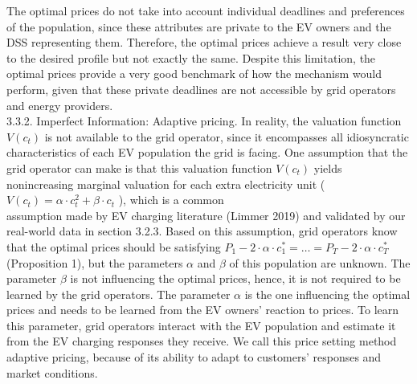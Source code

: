 \documentclass[10pt]{article}
\begin{document}
The optimal prices do not take into account individual deadlines and preferences of the population, since these attributes are private to the EV owners and the DSS representing them. Therefore, the optimal prices achieve a result very close to the desired profile but not exactly the same. Despite this limitation, the optimal prices provide a very good benchmark of how the mechanism would perform, given that these private deadlines are not accessible by grid operators and energy providers.\\
3.3.2. Imperfect Information: Adaptive pricing. In reality, the valuation function $V\left(c_{t}\right)$ is not available to the grid operator, since it encompasses all idiosyncratic characteristics of each EV population the grid is facing. One assumption that the grid operator can make is that this valuation function $V\left(c_{t}\right)$ yields nonincreasing marginal valuation for each extra electricity unit ( $V\left(c_{t}\right)=\alpha \cdot c_{t}^{2}+\beta \cdot c_{t}$ ), which is a common\\
assumption made by EV charging literature (Limmer 2019) and validated by our real-world data in section 3.2.3. Based on this assumption, grid operators know that the optimal prices should be satisfying $P_{1}-2 \cdot \alpha \cdot c_{1}^{*}=\ldots=P_{T}-2 \cdot \alpha \cdot c_{T}^{*}$ (Proposition 1), but the parameters $\alpha$ and $\beta$ of this population are unknown. The parameter $\beta$ is not influencing the optimal prices, hence, it is not required to be learned by the grid operators. The parameter $\alpha$ is the one influencing the optimal prices and needs to be learned from the EV owners' reaction to prices. To learn this parameter, grid operators interact with the EV population and estimate it from the EV charging responses they receive. We call this price setting method adaptive pricing, because of its ability to adapt to customers' responses and market conditions.
\end{document}
